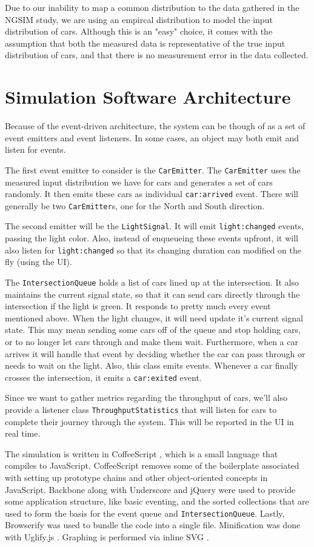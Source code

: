 \documentclass[a4paper,12pt]{article}
\begin{document}
Due to our inability to map a common distribution to the data gathered in the NGSIM study, we are using an empircal
distribution to model the input distribution of cars. Although this is an "easy" choice, it comes with the assumption
that both the measured data is representative of the true input distribution of cars, and that there is no measurement
error in the data collected. 

\section{Simulation Software Architecture}
Because of the event-driven architecture, the system can be though of as a set of event emitters and event listeners.
In some cases, an object may both emit and listen for events.

The first event emitter to consider is the \texttt{CarEmitter}. The \texttt{CarEmitter} uses the measured input
distribution we have for cars and generates a set of cars randomly. It then emits these cars as individual
\texttt{car:arrived} event. There will generally be two \texttt{CarEmitter}s, one for the North and South direction.

The second emitter will be the \texttt{LightSignal}. It will emit \texttt{light:changed} events, passing the light color.
Also, instead of enqueueing these events upfront, it will also listen for \texttt{light:changed} so that its
changing duration can modified on the fly (using the UI).

The \texttt{IntersectionQueue} holds a list of cars lined up at the intersection. It also maintains the
current signal state, so that it can send cars directly through the intersection if the light is green. It responds
to pretty much every event mentioned above. When the light changes, it will need update it's current signal state.
This may mean sending some cars off of the queue and stop holding cars, or to no longer let cars through and make them
wait. Furthermore, when a car arrives it will handle that event by deciding whether the car can pass through or needs
to wait on the light. Also, this class emits events. Whenever a car finally crosses the intersection, it emits
a \texttt{car:exited} event.

Since we want to gather metrics regarding the throughput of cars, we'll also provide a listener class
\texttt{ThroughputStatistics} that will listen for cars to complete their journey through the system. This will
be reported in the UI in real time.

The simulation is written in CoffeeScript \cite{coffeescript}, which is a small language that compiles to JavaScript.
CoffeeScript removes some of the boilerplate associated with setting up prototype chains and other object-oriented
concepts in JavaScript.
Backbone \cite{backbone} along with Underscore \cite{underscore} and jQuery \cite{jquery} were used to provide some
application structure, like basic eventing, and the sorted
collections that are used to form the basis for the event queue and \texttt{IntersectionQueue}. Lastly, Browserify
\cite{browserify} was used to bundle the code into a single file. Minification was done with Uglify.js \cite{uglify}.
Graphing is performed via inline SVG \cite{svg}.
\end{document}
